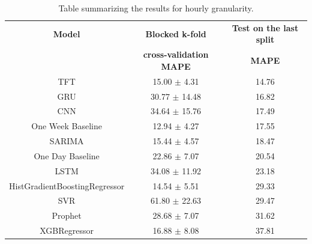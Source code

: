 \begin{table}[H]
\centering
\begin{tabular}{|c|c|c|}
\hline
\textbf{Model} & \textbf{Blocked k-fold} & \textbf{Test on the last split}\\
 & \textbf{cross-validation MAPE} & \textbf{MAPE}\\
\hline
TFT & 15.00 $\pm$ 4.31 & 14.76\\
\hline
GRU & 30.77 $\pm$ 14.48 & 16.82\\
\hline
CNN & 34.64 $\pm$ 15.76 & 17.49\\
\hline
One Week Baseline & 12.94 $\pm$ 4.27 & 17.55\\
\hline
SARIMA & 15.44 $\pm$ 4.57 & 18.47\\
\hline
One Day Baseline & 22.86 $\pm$ 7.07 & 20.54\\
\hline
LSTM & 34.08 $\pm$ 11.92 & 23.18\\
\hline
HistGradientBoostingRegressor & 14.54 $\pm$ 5.51 & 29.33\\
\hline
SVR & 61.80 $\pm$ 22.63 & 29.47\\
\hline
Prophet & 28.68 $\pm$ 7.07 & 31.62\\
\hline
XGBRegressor & 16.88 $\pm$ 8.08 & 37.81\\
\hline
\end{tabular}
\caption{Table summarizing the results for hourly granularity.}
\label{tab:demandhourlyresults}
\end{table}


